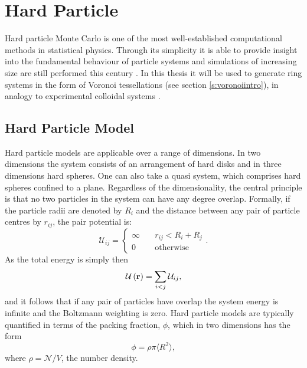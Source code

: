 \section{Hard Particle \mc}
\label{s:hardparticlemc}

Hard particle Monte Carlo is one of the most well\--established computational methods in statistical physics.
Through its simplicity it is able to provide insight into the fundamental behaviour of particle systems and simulations of increasing size are still performed this century \cite{Isobe2016,Bernard2009,Anderson2013,Isobe2015}.
In this thesis it will be used to generate ring systems in the form of Voronoi tessellations (see section \ref{s:voronoiintro}), in analogy to experimental colloidal systems \cite{Thorneywork2017}.

\subsection{Hard Particle Model}
\label{s:hardparticlemodelintro}

Hard particle models are applicable over a range of dimensions.
In two dimensions the system consists of an arrangement of hard disks and in three dimensions hard spheres.
One can also take a quasi \td{} system, which comprises hard spheres confined to a plane.
Regardless of the dimensionality, the central principle is that no two particles in the system can have any degree overlap.
Formally, if the particle radii are denoted by $R_i$ and the distance between any pair of particle centres by $r_{ij}$, the pair potential is:
\begin{equation}
	\mathcal{U}_{ij} = \begin{cases}
	\infty \quad &r_{ij}<R_i+R_j \\
	0 \quad &\text{otherwise} %
	\end{cases} .
\end{equation}
As the total energy is simply then
\begin{equation}
	\mathcal{U}\left(\mathbf{r}\right) = \sum_{i<j} \mathcal{U}_{ij},
\end{equation}
and it follows that if any pair of particles have overlap the system energy is infinite and the Boltzmann weighting is zero.
Hard particle models are typically quantified in terms of the packing fraction, $\phi$, which in two dimensions has the form
\begin{equation}
	\label{eq:packingfraction}
	\phi = \rho\pi\langle R^2\rangle,
\end{equation}
where $\rho=\mathcal{N}/{V}$, the number density.

